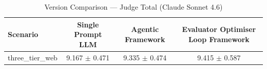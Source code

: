 \begin{table}[htbp]
\centering
\caption{Version Comparison — Judge Total (Claude Sonnet 4.6)}
\label{tab:version_judge_total_claude}
\begin{tabular}{lccc}
\toprule
Scenario & Single Prompt LLM & Agentic Framework & Evaluator Optimiser Loop Framework \\
\midrule
three\_tier\_web & 9.167 $\pm$ 0.471 & 9.335 $\pm$ 0.474 & 9.415 $\pm$ 0.587 \\
\bottomrule
\end{tabular}
\end{table}